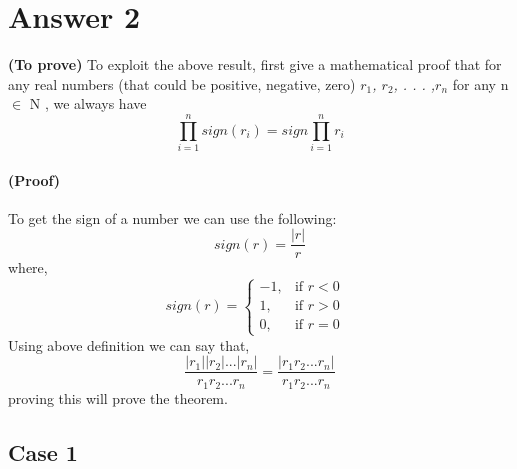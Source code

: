 \documentclass{article}
\begin{document}
\section{Answer 2}
\label{gen_inst}
\textbf{(To prove)}  To exploit the above result, first give a mathematical proof that for any real numbers
(that could be positive, negative, zero) \emph{$r_1$, $r_2$, . . . ,$ r_n$} for any n $\in$ N , we always have
\[\prod_{i=1 }^n sign(r_i) = sign \prod_{i=1}^n r_i\]

\paragraph{(Proof)}
To get the sign of a number we can use the following:
\begin{equation} \label{eq2}
sign(r)= \frac{|r|}{r}
\end{equation}
where,
$$
sign(r)=\begin{cases}
			-1, & \text{if $r<0$ }\\
            1, & \text{if $r>0$}\\
	0, & \text{if $r=0$}
		 \end{cases}
$$
Using above definition we can say that,
\[ \frac{|r_1||r_2|...|r_n|}{r_1r_2...r_n} = \frac {|r_1r_2...r_n|}{r_1r_2...r_n}\]
proving this will prove the theorem.\\

\subsection{Case 1}
\end{document}
